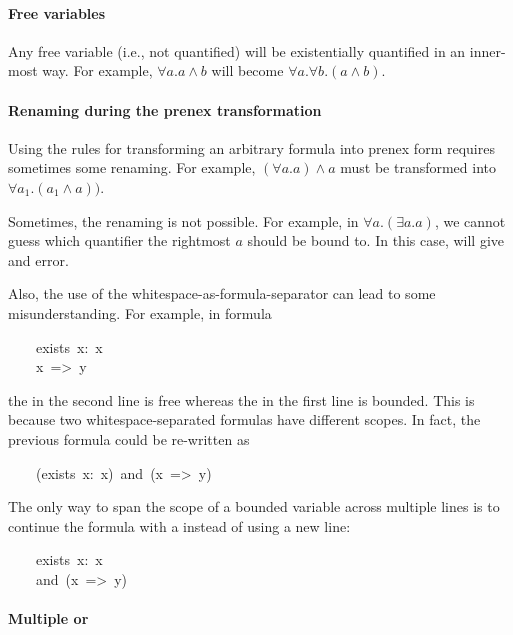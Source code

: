 \paragraph{Free variables}\label{sec-free-variables}%

\noindent Any free variable (i.e., not quantified) will be existentially quantified
in an inner-most way. For example, $\forall a. a \wedge b$ will become
$\forall a. \forall b. (a \wedge b)$.%

\paragraph{Renaming during the prenex transformation}\label{sec-renaming-during-the-prenex-transformation}%

\noindent Using the rules for transforming an arbitrary formula into prenex form
requires sometimes some renaming. For example, $(\forall a. a) \wedge a$
must be transformed into $\forall a_1. (a_1 \wedge a))$.%

Sometimes, the renaming is not possible. For example, in
$\forall a. (\exists a. a)$, we cannot guess which quantifier the
rightmost $a$ should be bound to. In this case,  will give and
error.%

Also, the use of the whitespace-as-formula-separator can lead to some
misunderstanding. For example, in formula%
\begin{mdpre}%
\noindent~~~~{exists}~x:~x\\
~~~~x~=\textgreater{}~y%
\end{mdpre}\noindent the  in the second line is free whereas the  in the first line
is bounded. This is because two whitespace-separated formulas have
different scopes. In fact, the previous formula could be re-written as
\begin{mdpre}%
\noindent~~~~({exists}~x:~x)~and~(x~=\textgreater{}~y)%
\end{mdpre}\noindent The only way to span the scope of a bounded variable across multiple lines
is to continue the formula with a  instead of using a new line:
\begin{mdpre}%
\noindent~~~~{exists}~x:~x\\
~~~~and~(x~=\textgreater{}~y)%
\end{mdpre}
\paragraph{Multiple  or }\label{sec-multiple-exists-or-forall}%

